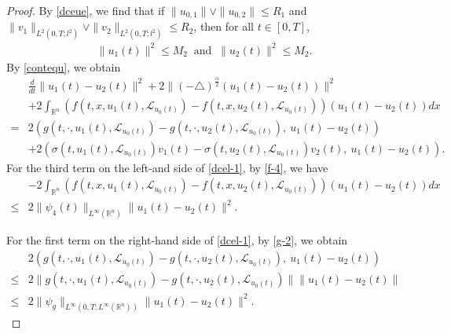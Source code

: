 \documentclass[11pt]{article}
\numberwithin{equation}{section}
\theoremstyle{plain}
\def\leq{\leqslant}
\begin{document}
\begin{proof}
 By \eqref{dceue}, we find that
 if  $\| u_{0,1} \|
 \vee \| u_{0,2} \|
  \leq R_1$
 and $\|v_1\|_{L^2(0,T; l^2)}
 \vee \|v_2\|_{L^2(0,T; l^2)} \leq R_2$,
 then   for all  $ t \in [0,T]$,
 \begin{align}\label{dcel-0}
    \| u_1(t) \|^2 \leq  M_2  \
    \text{ and } \
    \| u_2(t) \|^2 \leq  M_2.
 \end{align}
 By \eqref{contequ}, we obtain
 \begin{align}\label{dcel-1}
     & \frac{d}{dt} \| u_1(t) - u_2(t) \|^2
       + 2 \| (-\triangle)^{\frac{\alpha}{2}} \left( u_1(t) - u_2(t) \right) \|^2
             \nonumber \\
     & + 2 \int_{\mathbb{R}^n}
                   \left( f(t, x, u_1(t), \mathcal{L}_{u_0(t)} )
                           - f(t, x, u_2(t), \mathcal{L}_{u_0(t)})
                   \right)
                   \left( u_1(t) - u_2(t) \right) dx
          \nonumber \\
   = & 2
         \left(
                g(t, \cdot, u_1(t), \mathcal{L}_{u_0(t)} )
                 - g(t, \cdot, u_2(t), \mathcal{L}_{u_0(t)} ), \
                u_1(t) - u_2(t)
         \right)  \nonumber \\
     & + 2
          \left(
                 \sigma(t, u_1(t), \mathcal{L}_{u_0(t)} ) v_1(t)
                  - \sigma(t, u_2(t), \mathcal{L}_{u_0(t)} ) v_2(t), \
                 u_1(t) - u_2(t)
          \right).
 \end{align}
 For the third term on the left-and side of \eqref{dcel-1},
 by \eqref{f-4}, we have
\begin{align}\label{dce1-2}
     &  - 2  \int_{\mathbb{R}^n}
                    \left( f(t, x, u_1(t), \mathcal{L}_{u_0(t)} )
                            - f(t, x, u_2(t), \mathcal{L}_{u_0(t)})
                    \right)
                    \left( u_1(t) - u_2(t)
                    \right) dx
                   \nonumber \\
     \leq & 2 \| \psi_4(t) \|_{L^\infty(\mathbb{R}^n)} \| u_1(t) - u_2(t) \|^2.
\end{align}

 For the first term on the right-hand side of \eqref{dcel-1},
 by \eqref{g-2}, we obtain
\begin{align}\label{dce1-3}
       & 2
          \left(
                 g(t, \cdot, u_1(t), \mathcal{L}_{u_0(t)} )
                  - g(t, \cdot, u_2(t), \mathcal{L}_{u_0(t)} ), \
                 u_1(t) - u_2(t)
          \right)  \nonumber \\
  \leq & 2 \| g(t, \cdot, u_1(t), \mathcal{L}_{u_0(t)} ) - g(t, \cdot, u_2(t), \mathcal{L}_{u_0(t)} ) \|
           \| u_1(t) - u_2(t) \|
             \nonumber \\
  \leq & 2 \|\psi_g\|_{L^\infty(0,T;L^\infty(\mathbb{R}^n) ) }  \| u_1(t) - u_2(t) \|^2.
\end{align}


\end{proof}
\end{document}
